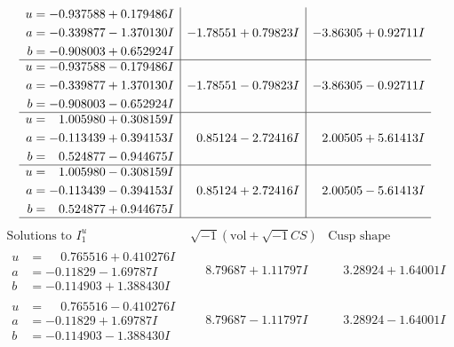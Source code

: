 \documentclass[1p]{elsarticle_modified}
\theoremstyle{definition}
\newcommand{\I}{\sqrt{-1}}
\begin{document}
$$\begin{array}{c|c|c}
\begin{aligned}
u &= -0.937588 + 0.179486 I \\
a &= -0.339877 - 1.370130 I \\
b &= -0.908003 + 0.652924 I\end{aligned}
 & -1.78551 + 0.79823 I & -3.86305 + 0.92711 I \\ \hline\begin{aligned}
u &= -0.937588 - 0.179486 I \\
a &= -0.339877 + 1.370130 I \\
b &= -0.908003 - 0.652924 I\end{aligned}
 & -1.78551 - 0.79823 I & -3.86305 - 0.92711 I \\ \hline\begin{aligned}
u &= \phantom{-}1.005980 + 0.308159 I \\
a &= -0.113439 + 0.394153 I \\
b &= \phantom{-}0.524877 - 0.944675 I\end{aligned}
 & \phantom{-}0.85124 - 2.72416 I & \phantom{-}2.00505 + 5.61413 I \\ \hline\begin{aligned}
u &= \phantom{-}1.005980 - 0.308159 I \\
a &= -0.113439 - 0.394153 I \\
b &= \phantom{-}0.524877 + 0.944675 I\end{aligned}
 & \phantom{-}0.85124 + 2.72416 I & \phantom{-}2.00505 - 5.61413 I\\
 \hline 
 \end{array}$$\newpage$$\begin{array}{c|c|c}  
\text{Solutions to }I^u_{1}& \I (\text{vol} + \sqrt{-1}CS) & \text{Cusp shape}\\
 \hline 
\begin{aligned}
u &= \phantom{-}0.765516 + 0.410276 I \\
a &= -0.11829 - 1.69787 I \\
b &= -0.114903 + 1.388430 I\end{aligned}
 & \phantom{-}8.79687 + 1.11797 I & \phantom{-}3.28924 + 1.64001 I \\ \hline\begin{aligned}
u &= \phantom{-}0.765516 - 0.410276 I \\
a &= -0.11829 + 1.69787 I \\
b &= -0.114903 - 1.388430 I\end{aligned}
 & \phantom{-}8.79687 - 1.11797 I & \phantom{-}3.28924 - 1.64001 I \\ \hline\begin{aligned}

\end{aligned}
\end{array}$$
\end{document}
